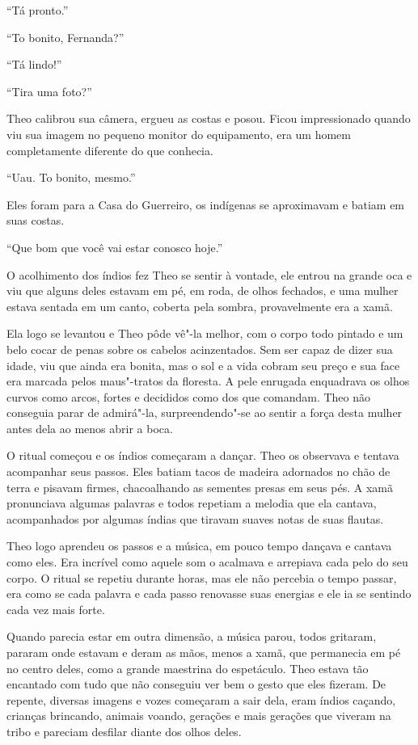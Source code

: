 ``Tá pronto.''

``To bonito, Fernanda?''

``Tá lindo!''

``Tira uma foto?''

Theo calibrou sua câmera, ergueu as costas e posou. Ficou impressionado
quando viu sua imagem no pequeno monitor do equipamento, era um homem
completamente diferente do que conhecia.

``Uau. To bonito, mesmo.''

Eles foram para a Casa do Guerreiro, os indígenas se aproximavam e
batiam em suas costas.

``Que bom que você vai estar conosco hoje.''

O acolhimento dos índios fez Theo se sentir à vontade, ele entrou na
grande oca e viu que alguns deles estavam em pé, em roda, de olhos
fechados, e uma mulher estava sentada em um canto, coberta pela sombra,
provavelmente era a xamã.

Ela logo se levantou e Theo pôde vê"-la melhor, com o corpo todo pintado
e um belo cocar de penas sobre os cabelos acinzentados. Sem ser capaz de
dizer sua idade, viu que ainda era bonita, mas o sol e a vida cobram seu
preço e sua face era marcada pelos maus"-tratos da floresta. A pele
enrugada enquadrava os olhos curvos como arcos, fortes e decididos como
dos que comandam. Theo não conseguia parar de admirá"-la,
surpreendendo"-se ao sentir a força desta mulher antes dela ao menos
abrir a boca.

O ritual começou e os índios começaram a dançar. Theo os observava e
tentava acompanhar seus passos. Eles batiam tacos de madeira adornados
no chão de terra e pisavam firmes, chacoalhando as sementes presas em
seus pés. A xamã pronunciava algumas palavras e todos repetiam a melodia
que ela cantava, acompanhados por algumas índias que tiravam suaves
notas de suas flautas.

Theo logo aprendeu os passos e a música, em pouco tempo dançava e
cantava como eles. Era incrível como aquele som o acalmava e arrepiava
cada pelo do seu corpo. O ritual se repetiu durante horas, mas ele não
percebia o tempo passar, era como se cada palavra e cada passo renovasse
suas energias e ele ia se sentindo cada vez mais forte.

Quando parecia estar em outra dimensão, a música parou, todos gritaram,
pararam onde estavam e deram as mãos, menos a xamã, que permanecia em pé
no centro deles, como a grande maestrina do espetáculo. Theo estava tão
encantado com tudo que não conseguiu ver bem o gesto que eles fizeram.
De repente, diversas imagens e vozes começaram a sair dela, eram índios
caçando, crianças brincando, animais voando, gerações e mais gerações
que viveram na tribo e pareciam desfilar diante dos olhos deles.

